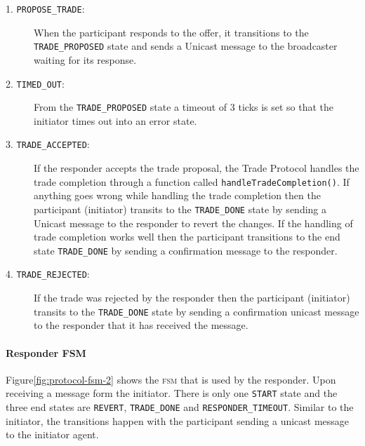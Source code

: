 \begin{description}
	\item[1. \texttt{PROPOSE\_TRADE}:]
	When the participant responds to the offer, it transitions to the \texttt{TRADE\_PROPOSED} state and sends a Unicast message to the broadcaster waiting for its response.
	\item[2. \texttt{TIMED\_OUT}:]
	From the \texttt{TRADE\_PROPOSED} state a timeout of 3 ticks is set so that the initiator times out into an error state.
	\item[3. \texttt{TRADE\_ACCEPTED}:]
	If the responder accepts the trade proposal, the Trade Protocol handles the trade completion through a function called \texttt{handleTradeCompletion()}. If anything goes wrong while handling the trade completion then the participant (initiator) transits to the \texttt{TRADE\_DONE} state by sending a Unicast message to the responder to revert the changes. If the handling of trade completion works well then the participant transitions to the end state \texttt{TRADE\_DONE} by sending a confirmation message to the responder.
	\item[4. \texttt{TRADE\_REJECTED}:]
	If the trade was rejected by the responder then the participant (initiator) transits to the \texttt{TRADE\_DONE} state by sending a confirmation unicast message to the responder that it has received the message.
\end{description}

\paragraph{Responder FSM}

Figure\ref{fig:protocol-fsm-2} shows the \textsc{fsm} that is used by the responder. Upon receiving a message form the initiator. There is only one \texttt{START} state and the three end states are \texttt{REVERT}, \texttt{TRADE\_DONE} and \texttt{RESPONDER\_TIMEOUT}. Similar to the initiator, the transitions happen with the participant sending a unicast message to the initiator agent.
 
